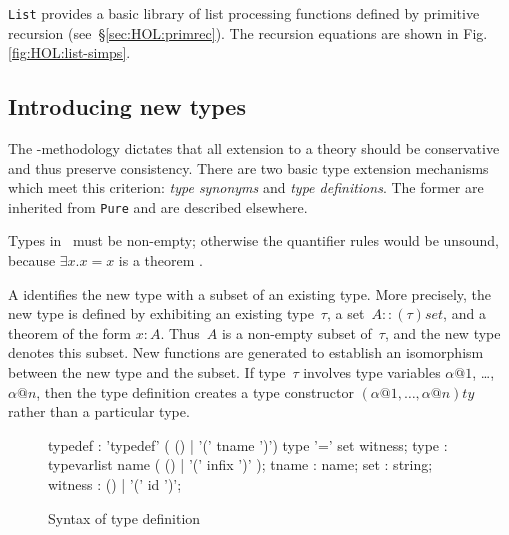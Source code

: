 {\tt List} provides a basic library of list processing functions defined by
primitive recursion (see~\S\ref{sec:HOL:primrec}). The recursion equations
are shown in Fig.\ts\ref{fig:HOL:list-simps}.


\subsection{Introducing new types}

The \HOL-methodology dictates that all extension to a theory should be
conservative and thus preserve consistency. There are two basic type
extension mechanisms which meet this criterion: {\em type synonyms\/} and
{\em type definitions\/}. The former are inherited from {\tt Pure} and are
described elsewhere.
\begin{warn}
  Types in \HOL\ must be non-empty; otherwise the quantifier rules would be
  unsound, because $\exists x. x=x$ is a theorem \cite[\S7]{paulson-COLOG}.
\end{warn}
A  identifies the new type with a subset of an
existing type. More precisely, the new type is defined by exhibiting an
existing type~$\tau$, a set~$A::(\tau)set$, and a theorem of the form $x:A$.
Thus~$A$ is a non-empty subset of~$\tau$, and the new type denotes this
subset.  New functions are generated to establish an isomorphism between the
new type and the subset.  If type~$\tau$ involves type variables $\alpha@1$,
\ldots, $\alpha@n$, then the type definition creates a type constructor
$(\alpha@1,\ldots,\alpha@n)ty$ rather than a particular type.

\begin{figure}[htbp]
\begin{rail}
typedef  : 'typedef' ( () | '(' tname ')') type '=' set witness;
type    : typevarlist name ( () | '(' infix ')' );
tname   : name;
set     : string;
witness : () | '(' id ')';
\end{rail}
\caption{Syntax of type definition}
\label{fig:HOL:typedef}
\end{figure}

